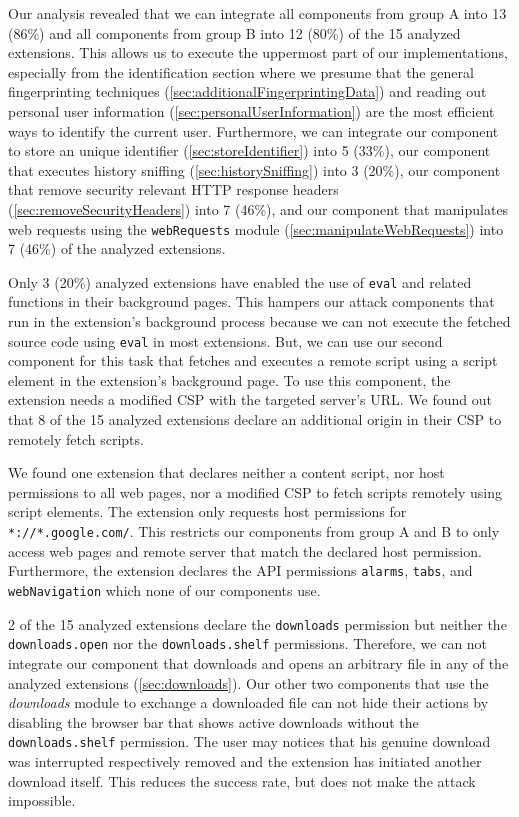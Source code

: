 	Our analysis revealed that we can integrate all components from group A into 13 (86\%) and all components from group B into 12 (80\%) of the 15 analyzed extensions. This allows us to execute the uppermost part of our implementations, especially from the identification section where we presume that the general fingerprinting techniques (\autoref{sec:additionalFingerprintingData}) and reading out personal user information (\autoref{sec:personalUserInformation}) are the most efficient ways to identify the current user. Furthermore, we can integrate our component to store an unique identifier (\autoref{sec:storeIdentifier}) into 5 (33\%), our component that executes history sniffing (\autoref{sec:historySniffing}) into 3 (20\%), our component that remove security relevant HTTP response headers (\autoref{sec:removeSecurityHeaders}) into 7 (46\%), and our component that manipulates web requests using the \texttt{webRequests} module (\autoref{sec:manipulateWebRequests}) into 7 (46\%) of the analyzed extensions.
	
	Only 3 (20\%) analyzed extensions have enabled the use of \texttt{eval} and related functions in their background pages. This hampers our attack components that run in the extension's background process because we can not execute the fetched source code using \texttt{eval} in most extensions. But, we can use our second component for this task that fetches and executes a remote script using a script element in the extension's background page. To use this component, the extension needs a modified CSP with the targeted server's URL. We found out that 8 of the 15 analyzed extensions declare an additional origin in their CSP to remotely fetch scripts. 
	
	We found one extension that declares neither a content script, nor host permissions to all web pages, nor a modified CSP to fetch scripts remotely using script elements. The extension only requests host permissions for \texttt{*://*.google.com/}. This restricts our components from group A and B to only access web pages and remote server that match the declared host permission. Furthermore, the extension declares the API permissions \texttt{alarms}, \texttt{tabs}, and \texttt{webNavigation} which none of our components use. %

	2 of the 15 analyzed extensions declare the \texttt{downloads} permission but neither the \texttt{downloads.open} nor the \texttt{downloads.shelf} permissions. Therefore, we can not integrate our component that downloads and opens an arbitrary file in any of the analyzed extensions (\autoref{sec:downloads}). Our other two components that use the \textit{downloads} module to exchange a downloaded file can not hide their actions by disabling the browser bar that shows active downloads without the \texttt{downloads.shelf} permission. The user may notices that his genuine download was interrupted respectively removed and the extension has initiated another download itself. This reduces the success rate, but does not make the attack impossible.
	
